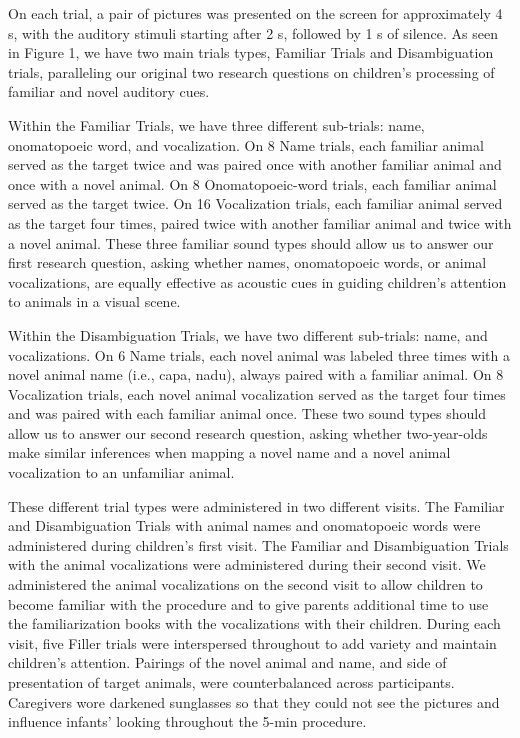 \documentclass[english,floatsintext,man]{apa6}
\theoremstyle{definition}
\theoremstyle{definition}
\theoremstyle{definition}
\theoremstyle{remark}
\begin{document}
On each trial, a pair of pictures was presented on the screen for
approximately 4 s, with the auditory stimuli starting after 2 s,
followed by 1 s of silence. As seen in Figure 1, we have two main trials
types, Familiar Trials and Disambiguation trials, paralleling our
original two research questions on children's processing of familiar and
novel auditory cues.

Within the Familiar Trials, we have three different sub-trials: name,
onomatopoeic word, and vocalization. On 8 Name trials, each familiar
animal served as the target twice and was paired once with another
familiar animal and once with a novel animal. On 8 Onomatopoeic-word
trials, each familiar animal served as the target twice. On 16
Vocalization trials, each familiar animal served as the target four
times, paired twice with another familiar animal and twice with a novel
animal. These three familiar sound types should allow us to answer our
first research question, asking whether names, onomatopoeic words, or
animal vocalizations, are equally effective as acoustic cues in guiding
children's attention to animals in a visual scene.

Within the Disambiguation Trials, we have two different sub-trials:
name, and vocalizations. On 6 Name trials, each novel animal was labeled
three times with a novel animal name (i.e., capa, nadu), always paired
with a familiar animal. On 8 Vocalization trials, each novel animal
vocalization served as the target four times and was paired with each
familiar animal once. These two sound types should allow us to answer
our second research question, asking whether two-year-olds make similar
inferences when mapping a novel name and a novel animal vocalization to
an unfamiliar animal.

These different trial types were administered in two different visits.
The Familiar and Disambiguation Trials with animal names and
onomatopoeic words were administered during children's first visit. The
Familiar and Disambiguation Trials with the animal vocalizations were
administered during their second visit. We administered the animal
vocalizations on the second visit to allow children to become familiar
with the procedure and to give parents additional time to use the
familiarization books with the vocalizations with their children. During
each visit, five Filler trials were interspersed throughout to add
variety and maintain children's attention. Pairings of the novel animal
and name, and side of presentation of target animals, were
counterbalanced across participants. Caregivers wore darkened sunglasses
so that they could not see the pictures and influence infants' looking
throughout the 5-min procedure.
\end{document}
